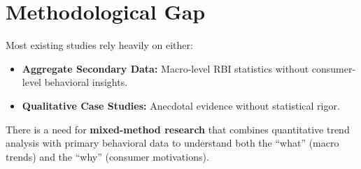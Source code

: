 \section{Methodological Gap}

Most existing studies rely heavily on either:
\begin{itemize}
    \item \textbf{Aggregate Secondary Data:} Macro-level RBI statistics without consumer-level behavioral insights.
    \item \textbf{Qualitative Case Studies:} Anecdotal evidence without statistical rigor.
\end{itemize}

There is a need for \textbf{mixed-method research} that combines quantitative trend analysis with primary behavioral data to understand both the ``what'' (macro trends) and the ``why'' (consumer motivations).

\vspace{1cm}

\noindent{}
